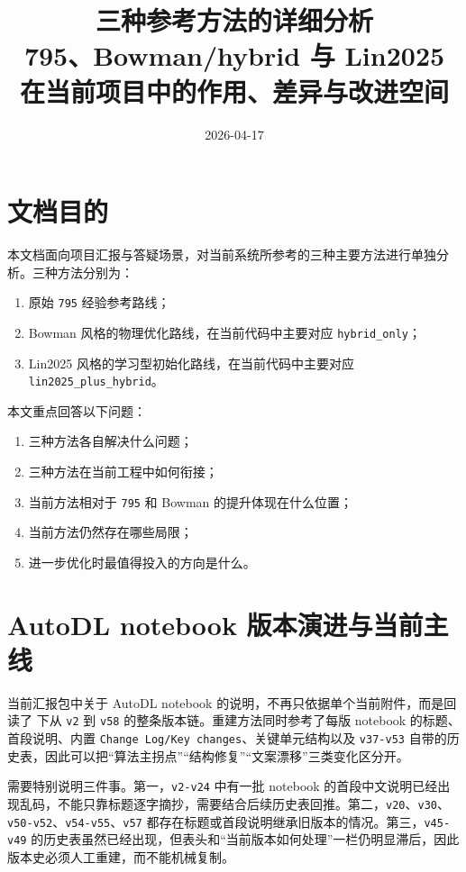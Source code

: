 \documentclass[12pt,a4paper]{ctexart}
\title{三种参考方法的详细分析\\
\large 795、Bowman/hybrid 与 Lin2025 在当前项目中的作用、差异与改进空间}
\author{}
\date{2026-04-17}
\begin{document}
\maketitle

\section{文档目的}
本文档面向项目汇报与答疑场景，对当前系统所参考的三种主要方法进行单独分析。三种方法分别为：
\begin{enumerate}[label=\arabic*.]
    \item 原始 \texttt{795} 经验参考路线；
    \item Bowman 风格的物理优化路线，在当前代码中主要对应 \texttt{hybrid\_only}；
    \item Lin2025 风格的学习型初始化路线，在当前代码中主要对应 \texttt{lin2025\_plus\_hybrid}。
\end{enumerate}

本文重点回答以下问题：
\begin{enumerate}[label=\arabic*.]
    \item 三种方法各自解决什么问题；
    \item 三种方法在当前工程中如何衔接；
    \item 当前方法相对于 \texttt{795} 和 Bowman 的提升体现在什么位置；
    \item 当前方法仍然存在哪些局限；
    \item 进一步优化时最值得投入的方向是什么。
\end{enumerate}

\section{AutoDL notebook 版本演进与当前主线}
当前汇报包中关于 AutoDL notebook 的说明，不再只依据单个当前附件，而是回读了  下从 \texttt{v2} 到 \texttt{v58} 的整条版本链。重建方法同时参考了每版 notebook 的标题、首段说明、内置 \texttt{Change Log/Key changes}、关键单元结构以及 \texttt{v37-v53} 自带的历史表，因此可以把“算法主拐点”“结构修复”“文案漂移”三类变化区分开。

需要特别说明三件事。第一，\texttt{v2-v24} 中有一批 notebook 的首段中文说明已经出现乱码，不能只靠标题逐字摘抄，需要结合后续历史表回推。第二，\texttt{v20}、\texttt{v30}、\texttt{v50-v52}、\texttt{v54-v55}、\texttt{v57} 都存在标题或首段说明继承旧版本的情况。第三，\texttt{v45-v49} 的历史表虽然已经出现，但表头和“当前版本如何处理”一栏仍明显滞后，因此版本史必须人工重建，而不能机械复制。
\end{document}
